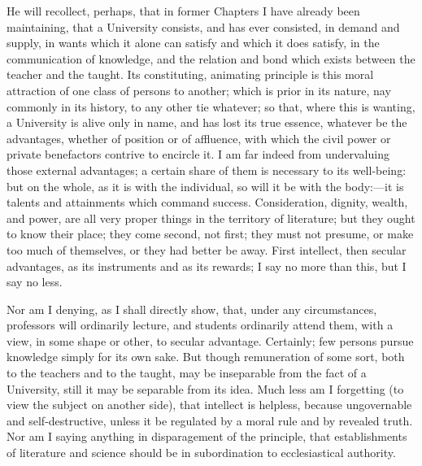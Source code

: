 He will recollect, perhaps, that in former Chapters I have already
been maintaining, that a University consists, and has ever consisted,
in demand and supply, in wants which it alone can satisfy and which it
does satisfy, in the communication of knowledge, and the relation and
bond which exists between the teacher and the taught. Its
constituting, animating principle is this moral attraction of one
class of persons to another; which is prior in its nature, nay
commonly in its history, to any other tie whatever; so that,
where this is wanting, a University is alive only in name, and has
lost its true essence, whatever be the advantages, whether of position
or of affluence, with which the civil power or private benefactors
contrive to encircle it. I am far indeed from undervaluing those
external advantages; a certain share of them is necessary to its
well-being: but on the whole, as it is with the individual, so will it
be with the body:—it is talents and attainments which command
success. Consideration, dignity, wealth, and power, are all very
proper things in the territory of literature; but they ought to know
their place; they come second, not first; they must not presume, or
make too much of themselves, or they had better be away. First
intellect, then secular advantages, as its instruments and as its
rewards; I say no more than this, but I say no less.

Nor am I denying, as I shall directly show, that, under any
circumstances, professors will ordinarily lecture, and students
ordinarily attend them, with a view, in some shape or other, to
secular advantage. Certainly; few persons pursue knowledge simply for
its own sake. But though remuneration of some sort, both to the
teachers and to the taught, may be inseparable from the fact of a
University, still it may be separable from its idea. Much less am I
forgetting (to view the subject on another side), that intellect is
helpless, because ungovernable and self-destructive, unless it be
regulated by a moral rule and by revealed truth. Nor am I saying
anything in disparagement of the principle, that establishments of
literature and science should be in subordination to ecclesiastical
authority.

